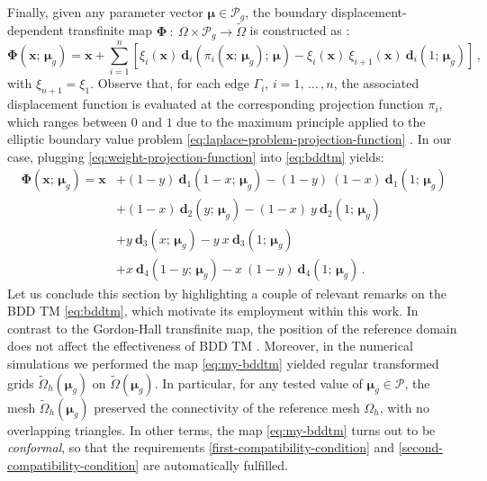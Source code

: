 \documentclass[12pt, a4paper, twoside, openright]{report}
\numberwithin{equation}{chapter}
\theoremstyle{theorem}
\theoremstyle{definition}
\theoremstyle{remark}
\theoremstyle{proposition}
\numberwithin{figure}{chapter}
\newcommand{\wt}[1]{\widetilde{#1}}
\newcommand{\bg}[1]{\boldsymbol{#1}}
\begin{document}
		Finally, given any parameter vector $\bg{\mu} \in \mathcal{P}_g$, the boundary displacement-dependent transfinite map $\bg{\Phi} ~ : ~ \Omega \times \mathcal{P}_g \rightarrow \wt{\Omega}$ is constructed as \cite{JIR14}:
		\begin{equation}
			\label{eq:bddtm}
			\bg{\Phi}(\bg{x}; \, \bg{\mu}_g) = \bg{x} + \sum_{i = 1}^{n} \left[ \xi_i(\bg{x}) ~ \bg{d}_i(\pi_i(\bg{x}; \, \bg{\mu}_g); \, \bg{\mu}) - \xi_i(\bg{x}) ~ \xi_{i+1}(\bg{x}) ~ \bg{d}_i(1; \, \bg{\mu}_g) \right] \, ,
		\end{equation}  
		with $\xi_{n+1} = \xi_1$. Observe that, for each edge $\Gamma_i$, $i = 1, \, \ldots \, , n$, the associated displacement function is evaluated at the corresponding projection function $\pi_i$, which ranges between $0$ and $1$ due to the maximum principle applied to the elliptic boundary value problem \eqref{eq:laplace-problem-projection-function} \cite{Rud64}. In our case, plugging \eqref{eq:weight-projection-function} into \eqref{eq:bddtm} yields:
		\begin{equation}
			\label{eq:my-bddtm}
			\begin{aligned}
				\bg{\Phi}(\bg{x}; \, \bg{\mu}_g) = \bg{x} & + (1-y) ~ \bg{d}_1(1-x; \, \bg{\mu}_g) - (1-y) ~ (1-x) ~ \bg{d}_1(1; \, \bg{\mu}_g) \\
				& + (1-x) ~ \bg{d}_2(y; \, \bg{\mu}_g) - (1-x) ~ y ~ \bg{d}_2(1; \, \bg{\mu}_g) \\
				& + y ~ \bg{d}_3(x; \, \bg{\mu}_g) - y ~ x ~ \bg{d}_3(1; \, \bg{\mu}_g) \\
				& + x ~ \bg{d}_4(1-y; \, \bg{\mu}_g) - x ~ (1-y) ~ \bg{d}_4(1; \, \bg{\mu}_g) \, .
			\end{aligned}
		\end{equation}
		Let us conclude this section by highlighting a couple of relevant remarks on the BDD TM \eqref{eq:bddtm}, which motivate its employment within this work. In contrast to the Gordon-Hall transfinite map, the position of the reference domain does not affect the effectiveness of BDD TM \cite{JIR14}. Moreover, in the numerical simulations we performed the map \eqref{eq:my-bddtm} yielded regular transformed grids $\wt{\Omega}_h(\bg{\mu}_g)$ on $\wt{\Omega}(\bg{\mu}_g)$. In particular, for any tested value of $\bg{\mu}_g \in \mathcal{P}$, the mesh $\wt{\Omega}_h(\bg{\mu}_g)$ preserved the connectivity of the reference mesh $\Omega_h$, with no overlapping triangles. In other terms, the map \eqref{eq:my-bddtm} turns out to be \emph{conformal}, so that the requirements \ref{first-compatibility-condition} and \ref{second-compatibility-condition} are automatically fulfilled. 
		
\end{document}
